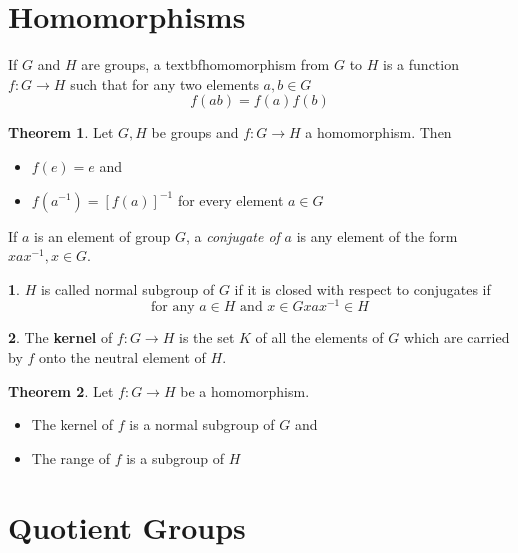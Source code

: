 \documentclass[a4paper,12pt]{article}
\theoremstyle{definition}
\newtheorem{definition}{}[section]
\theoremstyle{axiom}
\theoremstyle{theorem}
\newtheorem{theorem}{Theorem}[section]
\theoremstyle{lemma}
\begin{document}
\section{Homomorphisms}
If $G$ and $H$ are groups, a textbf{homomorphism} from $G$ to $H$ is a function $f: G \to H$ such that for any two elements $a,b \in G$ 
\begin{equation*}
    f(ab) = f(a)f(b)
\end{equation*}
\begin{theorem}{}
        Let $G, H$ be groups and $f: G \to H$ a homomorphism. Then
        \begin{itemize}
            \item $f(e) = e$ and
            \item $f(a^{-1}) = [f(a)]^{-1}$ for every element $a \in G$
        \end{itemize}
\end{theorem}
If $a$ is an element of group $G$, a \textit{conjugate of} $a$ is any element of the form $xax^{-1}, x \in G$.
\begin{definition}{}
$H$ is called normal subgroup of $G$ if it is closed with respect to conjugates if
        \begin{equation*}
                \text{for any } a \in H \text{ and } x \in G xax^{-1} \in H
        \end{equation*}
\end{definition}
\begin{definition}{}
        The \textbf{kernel} of $f: G \to H$ is the set $K$ of all the elements of $G$ which are carried by $f$ onto the neutral element of $H$.
\end{definition}
\begin{theorem}{}
        Let $f: G \to H$ be a homomorphism. 
        \begin{itemize}
            \item The kernel of $f$ is a normal subgroup of $G$ and
            \item The range of $f$ is a subgroup of $H$
        \end{itemize}
\end{theorem}
\section{Quotient Groups}
\end{document}
